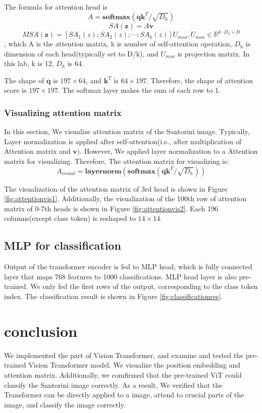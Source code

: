\documentclass[extendedabs]{bmvc2k}
\begin{document}
The formula for attention head is
$$
A = \textbf{softmax}(\textbf{q}\textbf{k}^T / \sqrt{D_h})
$$
$$
SA(\textbf{z}) = A\textbf{v}
$$
$$
MSA(\textbf{z}) = [SA_1(z);SA_2(z);\cdots;SA_k(z)]U_{msa}, U_{msa}\in \mathbb{R}^{k\cdot D_h \times D}
$$
, which A is the attention matrix, k is number of self-attention operation, $D_h$ is dimension of each head(typically set to D/k), and $U_{msa}$ is projection matrix. In this lab, k is 12, $D_h$ is 64. 

The shape of $\textbf{q}$ is $197\times64$, and $\textbf{k}^T$ is $64\times197$. Therefore, the shape of attention score is $197\times197$. The softmax layer makes the sum of each row to 1.
\subsubsection{Visualizing attention matrix}
In this section, We visualize attention matrix of the Santorini image. Typically, Layer normalization is applied after self-attention(i.e., after multiplication of Attention matrix and $\textbf{v})$. However, We applied layer normalization to a Attention matrix for visualizing. Therefore, The attention matrix for visualizing is:
$$
A_{visual} = \textbf{layernorm}(\textbf{softmax}(\textbf{q}\textbf{k}^T / \sqrt{D_h}))
$$

The visualization of the attention matrix of 3rd head is shown in Figure \ref{fig:attentionvis1}. Additionally, the visualization of the 100th row of attention matrix of 0-7th heads is shown in Figure \ref{fig:attentionvis2}. Each 196 columns(except class token) is reshaped to $14\times14$.

\subsection{MLP for classification}
Output of the transformer encoder is fed to MLP head, which is fully connected layer that maps 768 features to 1000 classifications. MLP head layer is also pre-trained. We only fed the first rows of the output, corresponding to the class token index. The classification result is shown in Figure \ref{fig:classificationres}.

\section{conclusion}
We implemented the part of Vision Transformer\cite{vit}, and examine and tested the pre-trained Vision Transformer model. We visualize the position embedding and attention matrix. Additionally, we comfirmed that the pre-trained ViT could classify the Santorini image correctly. As a result, We verified that the Transformer\cite{transformer} can be directly applied to a image, attend to crucial parts of the image, and classify the image correctly.
\end{document}
